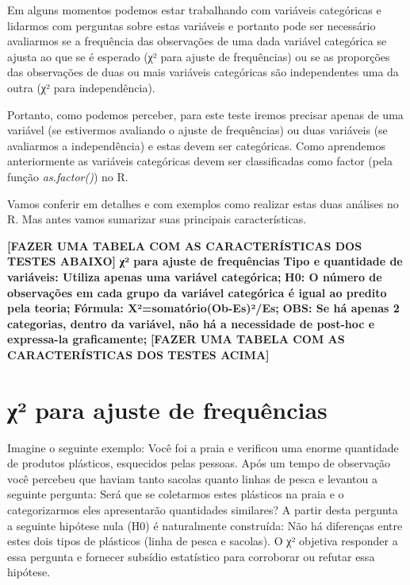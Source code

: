 \documentclass[]{book}
\begin{document}
Em alguns momentos podemos estar trabalhando com variáveis categóricas e lidarmos com perguntas sobre estas variáveis e portanto pode ser necessário avaliarmos se a frequência das observações de uma dada variável categórica se ajusta ao que se é esperado (χ² para ajuste de frequências) ou se as proporções das observações de duas ou mais variáveis categóricas são independentes uma da outra (χ² para independência).

Portanto, como podemos perceber, para este teste iremos precisar apenas de uma variável (se estivermos avaliando o ajuste de frequências) ou duas variáveis (se avaliarmos a independência) e estas devem ser categóricas. Como aprendemos anteriormente as variáveis categóricas devem ser classificadas como factor (pela função \emph{as.factor()}) no R.

Vamos conferir em detalhes e com exemplos como realizar estas duas análises no R. Mas antes vamos sumarizar suas principais características.

\textbf{{[}FAZER UMA TABELA COM AS CARACTERÍSTICAS DOS TESTES ABAIXO{]}}
\textbf{χ² para ajuste de frequências}
\textbf{Tipo e quantidade de variáveis: Utiliza apenas uma variável categórica;}
\textbf{H0: O número de observações em cada grupo da variável categórica é igual ao predito pela teoria;}
\textbf{Fórmula: X²=somatório(Ob-Es)²/Es;}
\textbf{OBS: Se há apenas 2 categorias, dentro da variável, não há a necessidade de post-hoc e expressa-la graficamente;}
\textbf{{[}FAZER UMA TABELA COM AS CARACTERÍSTICAS DOS TESTES ACIMA{]}}

\hypertarget{ux3c7-para-ajuste-de-frequuxeancias}{%
\section{χ² para ajuste de frequências}\label{ux3c7-para-ajuste-de-frequuxeancias}}

Imagine o seguinte exemplo: Você foi a praia e verificou uma enorme quantidade de produtos plásticos, esquecidos pelas pessoas. Após um tempo de observação você percebeu que haviam tanto sacolas quanto linhas de pesca e levantou a seguinte pergunta: Será que se coletarmos estes plásticos na praia e o categorizarmos eles apresentarão quantidades similares? A partir desta pergunta a seguinte hipótese nula (H0) é naturalmente construída: Não há diferenças entre estes dois tipos de plásticos (linha de pesca e sacolas). O χ² objetiva responder a essa pergunta e fornecer subsídio estatístico para corroborar ou refutar essa hipótese.
\end{document}
